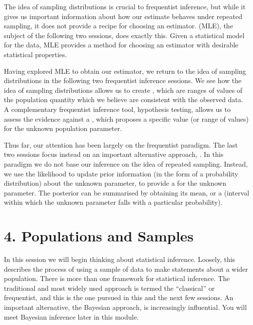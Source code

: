 \documentclass[letterpaper,10pt,english]{jupyterBook}
\begin{document}
\sphinxAtStartPar
The idea of sampling distributions is crucial to frequentist inference, but while it gives us important information about how our estimate behaves under repeated sampling, it does not provide a recipe for choosing an estimator.  (MLE), the subject of the following two sessions, does exactly this. Given a statistical model for the data, MLE provides a method for choosing an estimator with desirable statistical properties.

\sphinxAtStartPar
Having explored MLE to obtain our estimator, we return to the idea of sampling distributions in the following two frequentist inference sessions. We see how the idea of sampling distributions allows us to create , which are ranges of values of the population quantity which we believe are consistent with the observed data. A complementary frequentist inference tool, hypothesis testing, allows us to assess the evidence against a , which proposes a specific value (or range of values) for the unknown population parameter.

\sphinxAtStartPar
Thus far, our attention has been largely on the frequentist paradigm. The last two sessions focus instead on an important alternative approach, . In this paradigm we do not base our inference on the idea of repeated sampling. Instead, we use the likelihood to update prior information (in the form of a probability distribution) about the unknown parameter, to provide a  for the unknown parameter. The posterior can be summarised by obtaining its mean, or a  (interval within which  the unknown parameter falls with a particular probability).


\chapter{4. Populations and Samples}
\label{\detokenize{04.a. Population.and.samples:populations-and-samples}}\label{\detokenize{04.a. Population.and.samples::doc}}
\sphinxAtStartPar
In this session we will begin thinking about statistical inference. Loosely, this describes the process of using a sample of data to make statements about a wider population. There is more than one framework for statistical inference. The traditional and most widely used approach is termed the “classical” or frequentist, and this is the one pursued in this and the next few sessions. An important alternative, the Bayesian approach, is increasingly influential. You will meet Bayesian inference later in this module.
\end{document}
